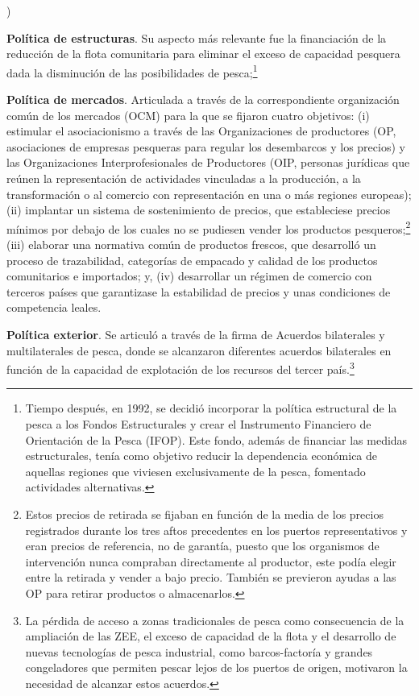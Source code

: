 \documentclass[10pt,a4paper]{article}
\newcounter{alphaitem}
\newenvironment{la}
      {\begin{list}{\alph{alphaitem})}{%
          \usecounter{alphaitem}%
          \setlength{\leftmargin}{1cm}%
          \setlength{\parskip}{3pt}%
          \setlength{\itemsep}{0pt}%
          \setlength{\parsep}{0pt}%
      }}
      {\end{list}}
\begin{document}
\begin{la}
{    }
    \item \textbf{Política de estructuras}. Su aspecto más relevante fue la financiación de la reducción de la flota comunitaria para eliminar el exceso de capacidad pesquera dada la disminución de las posibilidades de pesca;\footnote{%
        Tiempo después, en 1992, se decidió incorporar la política estructural de la pesca a los Fondos Estructurales y crear el Instrumento Financiero de Orientación de la Pesca (IFOP). Este fondo, además de financiar las medidas estructurales, tenía como objetivo reducir la dependencia económica de aquellas regiones que viviesen exclusivamente de la pesca, fomentado actividades alternativas.
    }
    \item \textbf{Política de mercados}. Articulada a través de la correspondiente organización común de los mercados (OCM) para la que se fijaron cuatro objetivos: (i) estimular el asociacionismo a través de las Organizaciones de productores (OP, asociaciones de empresas pesqueras para regular los desembarcos y los precios) y las Organizaciones Interprofesionales de Productores (OIP, personas jurídicas que reúnen la representación de actividades vinculadas a la producción, a la transformación o al comercio con representación en una o más regiones europeas); (ii) implantar un sistema de sostenimiento de precios, que estableciese precios mínimos por debajo de los cuales no se pudiesen vender los productos pesqueros;\footnote{%
        Estos precios de retirada se fijaban en función de la media de los precios registrados durante los tres aftos precedentes en los puertos representativos y eran precios de referencia, no de garantía, puesto que los organismos de intervención nunca compraban directamente al productor, este podía elegir entre la retirada y vender a bajo precio. También se previeron ayudas a las OP para retirar productos o almacenarlos.
    } (iii) elaborar una normativa común de productos frescos, que desarrolló un proceso de trazabilidad, categorías de empacado y calidad de los productos comunitarios e importados; y, (iv) desarrollar un régimen de comercio con terceros países que garantizase la estabilidad de precios y unas condiciones de competencia leales.
    \item \textbf{Política exterior}. Se articuló a través de la firma de Acuerdos bilaterales y multilaterales de pesca, donde se alcanzaron diferentes acuerdos bilaterales en función de la capacidad de explotación de los recursos del tercer país.\footnote{%
        La pérdida de acceso a zonas tradicionales de pesca como consecuencia de la ampliación de las ZEE, el exceso de capacidad de la flota y el desarrollo de nuevas tecnologías de pesca industrial, como barcos-factoría y grandes congeladores que permiten pescar lejos de los puertos de origen, motivaron la necesidad de alcanzar estos acuerdos.
}
\end{la}
\end{document}
